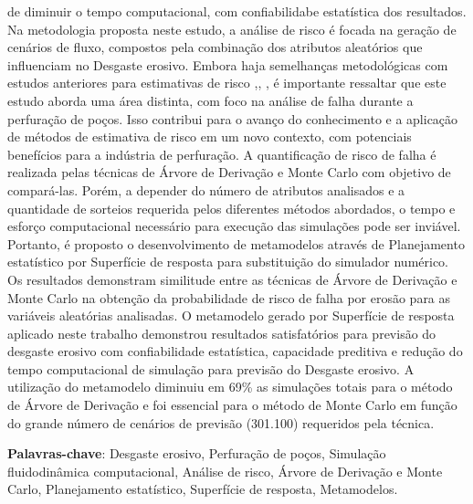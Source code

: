 \documentclass[
	12pt,				%
	openright,			%
	oneside,			%
	a4paper,			%
	english,			%
	french,				%
	spanish,			%
	brazil				%
	]{abntex2}
\begin{document}
\begin{resumo}
de diminuir o tempo computacional, com confiabilidabe estatística dos resultados. Na metodologia proposta neste estudo, a análise de risco é focada na geração de cenários de fluxo, compostos pela combinação dos atributos aleatórios que influenciam no Desgaste erosivo. Embora haja semelhanças metodológicas com estudos anteriores para estimativas de risco \cite{loschiavo},\cite{steagall}, \cite{santoss2}, é importante ressaltar que este estudo aborda uma área distinta, com foco na análise de falha durante a perfuração de poços. Isso contribui para o avanço do conhecimento e a aplicação de métodos de estimativa de risco em um novo contexto, com potenciais benefícios para a indústria de perfuração. A quantificação de risco de falha é realizada pelas técnicas de Árvore de Derivação e Monte Carlo com objetivo de compará-las. Porém, a depender do número de atributos analisados e a quantidade de sorteios requerida pelos diferentes métodos abordados, o tempo e esforço computacional necessário para execução das simulações pode ser inviável. Portanto, é proposto o desenvolvimento de metamodelos através de Planejamento estatístico por Superfície de resposta para substituição do simulador numérico. Os resultados demonstram similitude entre as técnicas de Árvore de Derivação e Monte Carlo na obtenção da probabilidade de risco de falha por erosão para as variáveis aleatórias analisadas. O metamodelo gerado por Superfície de resposta aplicado neste trabalho demonstrou resultados satisfatórios para previsão do desgaste erosivo com confiabilidade estatística, capacidade preditiva e redução do tempo computacional de simulação para previsão do Desgaste erosivo. A utilização do metamodelo diminuiu em 69\% as simulações totais para o método de Árvore de Derivação e foi essencial para o método de Monte Carlo em função do grande número de cenários de previsão (301.100) requeridos pela técnica. 





 \textbf{Palavras-chave}: Desgaste erosivo, Perfuração de poços, Simulação fluidodinâmica computacional, Análise de risco, Árvore de Derivação e Monte Carlo, Planejamento estatístico, Superfície de resposta, Metamodelos.
\end{resumo}
\end{document}

